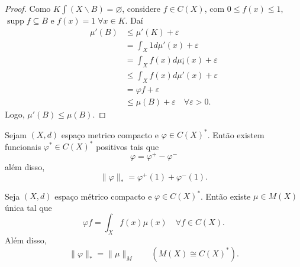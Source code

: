\documentclass[portuguese]{article}
\theoremstyle{definition}
\begin{document}
\begin{proof}
	Como $K\int(X\backslash B)=\varnothing$, considere $f\in C(X)$, com $0\leq f(x)\leq1$, $\operatorname{supp}f\subseteq B$ e $f(x)=1\;\forall x\in K$. Daí
	\begin{align*}
		\mu'(B)&\leq \mu'(K)+\varepsilon\\
		&=\int_X1d\mu'(x)+\varepsilon\\
		&=\int_Xf(x)d\mu¡(x)+\varepsilon\\
		&\leq\int_Xf(x)d\mu'(x)+\varepsilon\\
		&=\varphi f+\varepsilon\\
		&\leq\mu(B)+\varepsilon\quad\forall\varepsilon>0.
	\end{align*}
	Logo, $\mu'(B)\leq\mu(B)$.
\end{proof}
\begin{prop}
	Sejam $(X,d)$ espaço metrico compacto e $\varphi\in C(X)^*$. Então existem funcionais $\varphi^*\in C(X)^*$ positivos tais que
	\[\varphi=\varphi^+-\varphi^-\]
	além disso,
	\[\|\varphi\|_*=\varphi^+(1)+\varphi^-(1).\]
\end{prop}
\begin{teo}
	Seja $(X,d)$ espaço métrico compacto e $\varphi\in C(X)^*$. Então existe $\mu\in M(X)$ única tal que
	\[\varphi f=\int_Xf(x)\mu(x)\quad\forall f\in C(X).\]
	Além disso,
	\[\|\varphi\|_*=\|\mu\|_M\qquad (M(X)\cong C(X)^*).\]
\end{teo}
\end{document}
